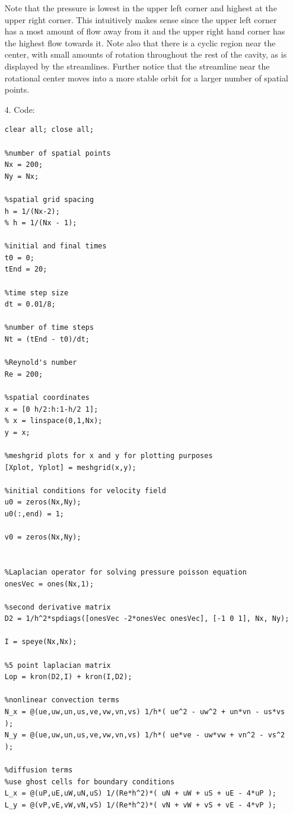 \documentclass{article}
\begin{document}
\begin{itemize}
     Note that the pressure is lowest in the upper left corner and highest at the upper right corner. This intuitively makes sense since the upper left corner has a most amount of flow away from it and the upper right hand corner has the highest flow towards it. Note also that there is a cyclic region near the center, with small amounts of rotation throughout the rest of the cavity, as is displayed by the streamlines. Further notice that the streamline near the rotational center moves into a more stable orbit for a larger number of spatial points.



     \pagebreak
     \item[4.] Code:
    \begin{center}
        \begin{lstlisting}[style = Matlab-editor]
            %finite volume NS implementation
clear all; close all;

%number of spatial points
Nx = 200;
Ny = Nx;

%spatial grid spacing
h = 1/(Nx-2);
% h = 1/(Nx - 1);

%initial and final times
t0 = 0;
tEnd = 20;

%time step size
dt = 0.01/8;

%number of time steps
Nt = (tEnd - t0)/dt;

%Reynold's number
Re = 200;

%spatial coordinates
x = [0 h/2:h:1-h/2 1];
% x = linspace(0,1,Nx);
y = x;

%meshgrid plots for x and y for plotting purposes
[Xplot, Yplot] = meshgrid(x,y);

%initial conditions for velocity field
u0 = zeros(Nx,Ny);
u0(:,end) = 1;

v0 = zeros(Nx,Ny);


%Laplacian operator for solving pressure poisson equation
onesVec = ones(Nx,1);

%second derivative matrix
D2 = 1/h^2*spdiags([onesVec -2*onesVec onesVec], [-1 0 1], Nx, Ny);

I = speye(Nx,Nx);

%5 point laplacian matrix
Lop = kron(D2,I) + kron(I,D2);

%nonlinear convection terms
N_x = @(ue,uw,un,us,ve,vw,vn,vs) 1/h*( ue^2 - uw^2 + un*vn - us*vs );
N_y = @(ue,uw,un,us,ve,vw,vn,vs) 1/h*( ue*ve - uw*vw + vn^2 - vs^2 );

%diffusion terms
%use ghost cells for boundary conditions
L_x = @(uP,uE,uW,uN,uS) 1/(Re*h^2)*( uN + uW + uS + uE - 4*uP );
L_y = @(vP,vE,vW,vN,vS) 1/(Re*h^2)*( vN + vW + vS + vE - 4*vP );


\end{lstlisting}
\end{center}
\end{itemize}
\end{document}
